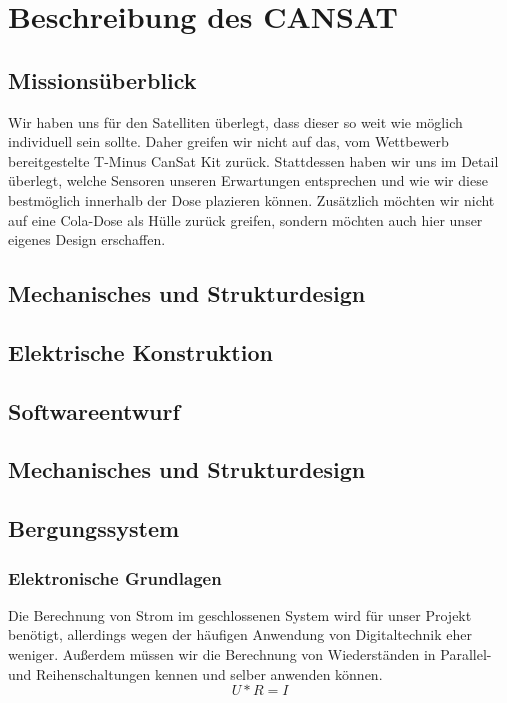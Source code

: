 \section{Beschreibung des CANSAT}

\subsection{Missionsüberblick}
Wir haben uns für den Satelliten überlegt, dass dieser so weit wie möglich individuell sein sollte. Daher greifen wir nicht auf das, vom Wettbewerb bereitgestelte T-Minus CanSat Kit zurück. Stattdessen haben wir uns im Detail überlegt, welche Sensoren unseren Erwartungen entsprechen und wie wir diese bestmöglich innerhalb der Dose plazieren können. Zusätzlich möchten wir nicht auf eine Cola-Dose als Hülle zurück greifen, sondern möchten auch hier unser eigenes Design erschaffen.

\subsection{Mechanisches und Strukturdesign}

\subsection{Elektrische Konstruktion}

\subsection{Softwareentwurf}

\subsection{Mechanisches und Strukturdesign}

\subsection{Bergungssystem}






\subsubsection{Elektronische Grundlagen}
Die Berechnung von Strom im geschlossenen System wird für unser Projekt benötigt, allerdings wegen der häufigen Anwendung von Digitaltechnik eher weniger. Außerdem müssen wir die Berechnung von Wiederständen in Parallel- und Reihenschaltungen kennen und selber anwenden können.
\[
U * R = I
\]

